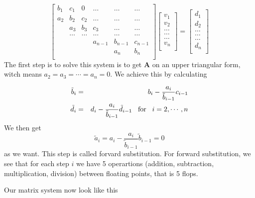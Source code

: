 \documentclass[11pt]{article}
\begin{document}
\[
\begin{bmatrix}
    b_1 & c_1 & 0   &\dots & \dots & \dots \\
    a_2 & b_2 & c_2 & \dots& \dots & \dots \\
        & a_3 & b_3 & c_3  & \dots & \dots \\
        &\dots&\dots &\dots  &\dots & \dots \\
     & &  &a_{n-1}&b_{n-1} &c_{n-1} \\
     &    &  &  & a_{n} & b_n \\
\end{bmatrix}
\begin{bmatrix}
      v_1\\
      v_2\\
      \dots \\
      \dots  \\
      \dots \\
      v_n\\
\end{bmatrix}
=\begin{bmatrix}
      {d}_1\\
      {d}_2\\
      \dots \\
      \dots \\
      \dots \\
      {d}_n\\
\end{bmatrix}
\]
The first step is to solve this system is to get $\mathbf{A}$ on an upper triangular form,
witch means $a_2 = a_3 = \cdots = a_{n} = 0$. We achieve this by calculating

\begin{eqnarray*}
\tilde{b}_i &=& b_i -\frac{a_i}{\tilde{b}_{i-1}}c_{i-1}\\
\tilde{d}_i &=& d_i -\frac{a_i}{\tilde{b}_{i-1}}\tilde{d}_{i-1}
\hspace{0.3cm} \text{for} \hspace{0.3cm} i = 2, \cdots, n  
\end{eqnarray*}
We then get
\begin{equation*}
\tilde{a}_i = a_i -\frac{a_i}{\tilde{b}_{i-1}}\tilde{b}_{i-1} = 0
\end{equation*}
as we want. This step is called forvard substitution. For forward substitution, we see that
for each step $i$ we have
5 operartions (addition, subtraction, multiplication, division) between floating points, that
is 5 flops. 

\vspace{4mm}
\noindent
Our matrix system now look like this
\end{document}
